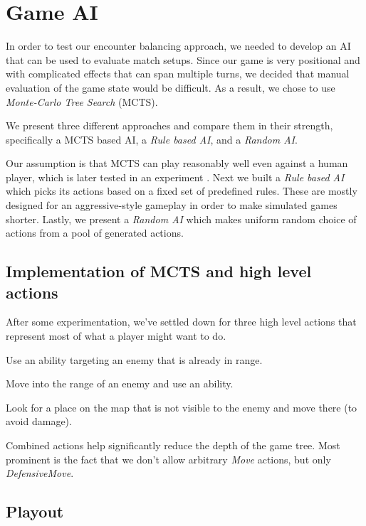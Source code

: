\chapter{Game AI}

In order to test our encounter balancing approach, we needed to develop an
AI that can be used to evaluate match setups. Since our game is very
positional and with complicated effects that can span multiple turns, we
decided that manual evaluation of the game state would be difficult. As a
result, we chose to use \emph{Monte-Carlo Tree Search} (MCTS).

We present three different approaches and compare them in their strength,
specifically a MCTS based AI, a \emph{Rule based AI}, and a \emph{Random
AI}.

Our assumption  is that MCTS can play reasonably well
even against a human player, which is later tested in an experiment
. Next we built a \emph{Rule based AI} which picks
its actions based on a fixed set of predefined rules. These are mostly
designed for an aggressive-style gameplay in order to make simulated games
shorter. Lastly, we present a \emph{Random AI} which makes uniform random
choice of actions from a pool of generated actions.


\section{Implementation of MCTS and high level actions}

After some experimentation, we've settled down for three high level actions
that represent most of what a player might want to do.

\begin{description}[align=right,labelwidth=3cm]
\item [AbilityUse] Use an ability targeting an enemy that is already in range.
\item [AttackMove] Move into the range of an enemy and use an ability.
\item [DefensiveMove] Look for a place on the map that is not visible to the enemy and move there (to avoid damage).
\end{description}

Combined actions help significantly reduce the depth of the game tree. Most
prominent is the fact that we don't allow arbitrary \emph{Move} actions, but
only \emph{DefensiveMove}.


\section{Playout}

